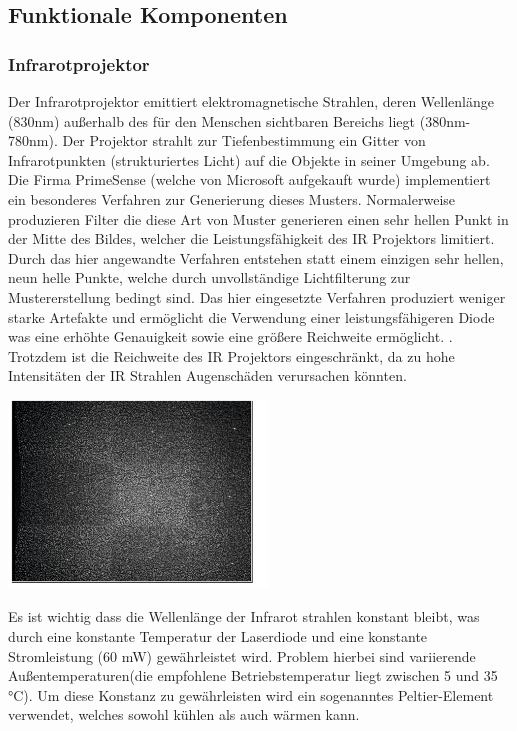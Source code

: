 \documentclass[
	12pt,
	a4paper,
	BCOR10mm,
	DIV14,
	listof=totoc,
	bibliography=totoc,
	headsepline
]{scrreprt}
\begin{document}
\subsection{Funktionale Komponenten}
\subsubsection{Infrarotprojektor}

Der Infrarotprojektor emittiert elektromagnetische Strahlen, deren Wellenlänge (830nm) außerhalb des für den Menschen sichtbaren Bereichs liegt (380nm-780nm).
Der Projektor strahlt zur Tiefenbestimmung ein Gitter von Infrarotpunkten (strukturiertes Licht) auf die Objekte in seiner Umgebung ab. 
Die Firma PrimeSense (welche von Microsoft aufgekauft wurde) implementiert ein besonderes Verfahren zur Generierung dieses Musters.
Normalerweise produzieren Filter die diese Art von Muster generieren einen sehr hellen Punkt in der Mitte des Bildes, welcher die Leistungsfähigkeit des IR Projektors limitiert.\\


Durch das hier angewandte Verfahren entstehen statt einem einzigen sehr hellen, neun helle Punkte, welche durch unvollständige Lichtfilterung zur Mustererstellung bedingt sind. Das hier eingesetzte Verfahren produziert weniger starke Artefakte und ermöglicht die Verwendung einer leistungsfähigeren Diode was eine erhöhte Genauigkeit sowie eine größere Reichweite ermöglicht. . Trotzdem ist die Reichweite des IR Projektors eingeschränkt, da zu hohe Intensitäten der IR Strahlen Augenschäden verursachen könnten.


\includegraphics[height=5cm]{Res/9_Dots.png}



Es ist wichtig dass die Wellenlänge der Infrarot strahlen konstant bleibt, was durch eine konstante Temperatur der Laserdiode und eine konstante Stromleistung (60 mW) gewährleistet wird. Problem hierbei sind variierende Außentemperaturen(die empfohlene Betriebstemperatur  liegt zwischen 5 und 35 °C). Um diese Konstanz zu gewährleisten wird ein sogenanntes  Peltier-Element verwendet, welches sowohl kühlen als auch wärmen kann.\\
\end{document}
